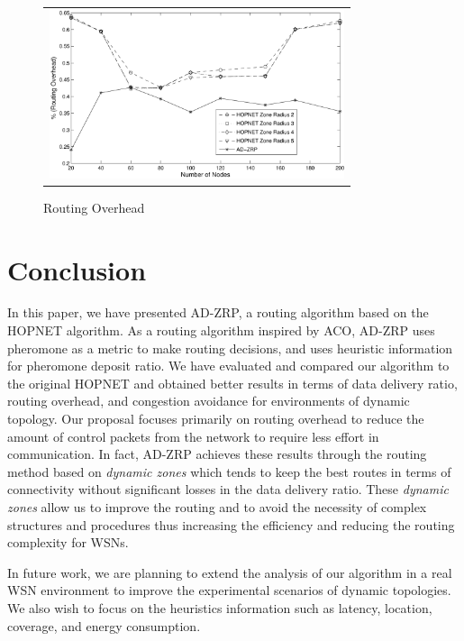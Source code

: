 \documentclass[conference]{IEEEtran}
\begin{document}
\begin{figure}[htb]
\begin{tabular}{c}
\includegraphics[width=245pt]{fig/routing_overhead.pdf}
\end{tabular}
\caption{Routing Overhead}
\label{routing_overhead}
\end{figure}

\section{Conclusion}
\label{conclusion}

In this paper, we have presented AD-ZRP, a routing algorithm based on the HOPNET algorithm.
As a routing algorithm inspired by ACO, AD-ZRP uses pheromone as a metric to make routing decisions, and uses heuristic information for pheromone deposit ratio.
We have evaluated and compared our algorithm to the original HOPNET and obtained better results in terms of data delivery ratio, routing overhead, and congestion avoidance for environments of dynamic topology.
Our proposal focuses primarily on routing overhead to reduce the amount of control packets from the network to require less effort in communication.
In fact, AD-ZRP achieves these results through the routing method based on \emph{dynamic zones} which tends to keep the best routes in terms of connectivity without significant losses in the data delivery ratio.
These \emph{dynamic zones} allow us to improve the routing and to avoid the necessity of complex structures and procedures thus increasing the efficiency and reducing the routing complexity for WSNs.

In future work, we are planning to extend the analysis of our algorithm in a real WSN environment to improve the experimental scenarios of dynamic topologies.
We also wish to focus on the heuristics information such as latency, location, coverage, and energy consumption.



\end{document}
